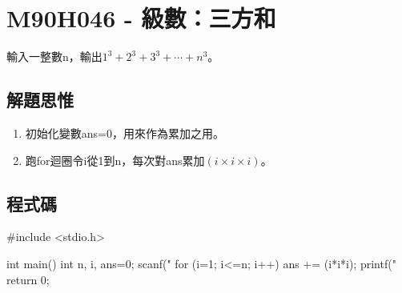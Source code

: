 \section{M90H046 - 級數：三方和}
輸入一整數n，輸出$1^3+2^3+3^3+\cdots+n^3$。
\subsection{解題思惟}
\begin{enumerate}
	\item 初始化變數ans=0，用來作為累加之用。
	\item 跑for迴圈令i從1到n，每次對ans累加$(i\times i\times i)$。
\end{enumerate}
\subsection{程式碼}
\begin{cppcode}
	#include <stdio.h>
	
	int main()
	{
		int n, i, ans=0;
		scanf("%
		for (i=1; i<=n; i++) {
			ans += (i*i*i);
		}
		printf("%
		return 0;
	}
	
\end{cppcode}
